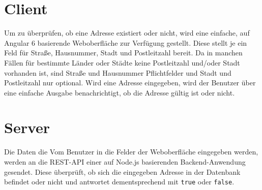 \documentclass[
	a4paper,
	12p,
	bibliography=totocnumbered
]{scrartcl}
\begin{document}
\section{Client}

Um zu überprüfen, ob eine Adresse existiert oder nicht, wird eine einfache, auf Angular 6 basierende Weboberfläche zur Verfügung gestellt. Diese stellt je ein Feld für Straße, Hausnummer, Stadt und Postleitzahl  bereit. Da in manchen Fällen für bestimmte Länder oder Städte keine Postleitzahl und/oder Stadt vorhanden ist, sind Straße und Hausnummer Pflichtfelder und Stadt und Postleitzahl nur optional. Wird eine Adresse eingegeben, wird der Benutzer über eine einfache Ausgabe benachrichtigt, ob die Adresse gültig ist oder nicht.

\section{Server}

Die Daten die Vom Benutzer in die Felder der Weboberfläche eingegeben werden, werden an die REST-API einer auf Node.js basierenden Backend-Anwendung gesendet. Diese überprüft, ob sich die eingegeben Adresse in der Datenbank befindet oder nicht und antwortet dementsprechend mit \texttt{true} oder \texttt{false}.
\end{document}
